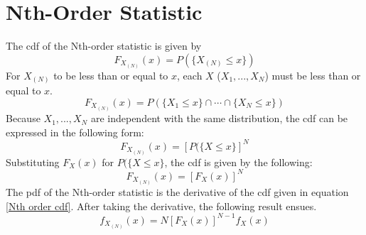 \documentclass[conference]{IEEEtran}
\begin{document}
\section{Nth-Order Statistic}
\label{Nth-Order Statistic Section}
The cdf of the Nth-order statistic is given by
\begin{equation}
F_{X_{(N)}}(x) = P(\{X_{(N)} \leq x\})
\end{equation}
For $X_{(N)}$ to be less than or equal to $x$, each $X$ ($X_1,...,X_N$) must be less than or equal to $x$.
\begin{equation}
F_{X_{(N)}}(x) = P(\{X_1 \leq x \} \cap \cdots \cap \{X_N \leq x \})
\end{equation}
Because $X_1,...,X_N$ are independent with the same distribution, the cdf can be expressed in the following form:
\begin{equation}
F_{X_{(N)}}(x) = [P(\{X \leq x \}]^N
\end{equation}
Substituting $F_X(x)$ for $P(\{X \leq x \}$, the cdf is given by the following:
\begin{equation}
\label{Nth order cdf}
F_{X_{(N)}}(x) = [F_X(x)]^N
\end{equation}
The pdf of the Nth-order statistic is the derivative of the cdf given in equation \eqref{Nth order cdf}. After taking the derivative, the following result ensues.
\begin{equation}
f_{X_{(N)}}(x) = N[F_X(x)]^{N-1}f_X(x)
\end{equation}
\end{document}
